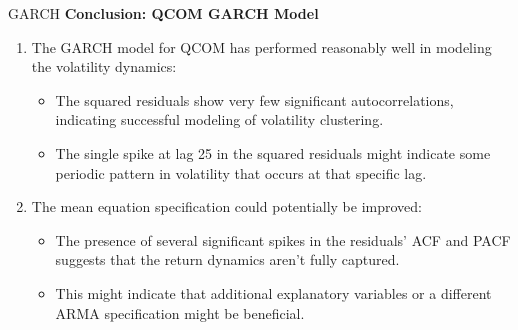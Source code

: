 \documentclass{beamer}[9pt]
\begin{document}
\begin{frame}{GARCH}
	\textbf{Conclusion: QCOM GARCH Model}
	\begin{enumerate}
	\item The GARCH model for QCOM has performed reasonably well in modeling the volatility dynamics:
	\begin{itemize}
		\item The squared residuals show very few significant autocorrelations, indicating successful modeling of volatility clustering.
		\item The single spike at lag 25 in the squared residuals might indicate some periodic pattern in volatility that occurs at that specific lag.
	\end{itemize}
	\item The mean equation specification could potentially be improved:
	\begin{itemize}
		\item The presence of several significant spikes in the residuals’ ACF and PACF suggests that the return dynamics aren’t fully captured.
		\item This might indicate that additional explanatory variables or a different ARMA specification might be beneficial.
	\end{itemize}
\end{enumerate}
\end{frame}
\end{document}

